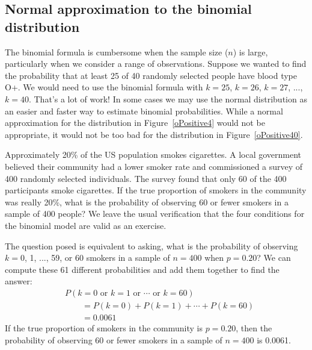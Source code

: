 \subsection{Normal approximation to the binomial distribution}


The binomial formula is cumbersome when the sample size ($n$) is large, particularly when we consider a range of observations. Suppose we wanted to find the probability that at least 25 of 40 randomly selected people have blood type O+. We would need to use the binomial formula with $k=25$, $k=26$, $k=27$, ..., $k=40$. That's a lot of work! In some cases we may use the normal distribution as an easier and faster way to estimate binomial probabilities. While a normal approximation for the distribution in Figure~\ref{oPositive4} would not be appropriate, it would not be too bad for the distribution in Figure~\ref{oPositive40}.

\begin{examplewrap}
\begin{nexample}{Approximately 20\% of the US population smokes cigarettes. A local government believed their community had a lower smoker rate and commissioned a survey of 400 randomly selected individuals. The survey found that only 60 of the 400 participants smoke cigarettes. If the true proportion of smokers in the community was really 20\%, what is the probability of observing 60 or fewer smokers in a sample of 400 people?}\label{exactBinomialForN400P20SmokerExample}
We leave the usual verification that the four conditions for the binomial model are valid as an exercise.

The question posed is equivalent to asking, what is the probability of observing $k=0$, 1, ..., 59, or 60 smokers in a sample of $n=400$ when $p=0.20$? We can compute these 61 different probabilities and add them together to find the answer:
\begin{align*}
&P(k=0\text{ or }k=1\text{ or } \cdots \text{ or } k=60) \\
	&\qquad= P(k=0) + P(k=1) + \cdots + P(k=60) \\
	&\qquad=0.0061
\end{align*}
If the true proportion of smokers in the community is $p=0.20$, then the probability of observing 60 or fewer smokers in a sample of $n=400$ is 0.0061.
\end{nexample}
\end{examplewrap}

